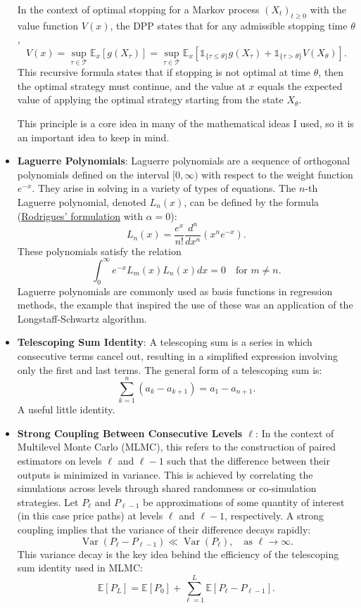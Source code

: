 \documentclass[titlepage]{article}
\begin{document}
\begin{itemize}
    In the context of optimal stopping for a Markov process $(X_t)_{t \geq 0}$ with the value function $V(x)$, the DPP states that for any admissible stopping time $\theta$,
    \[
    V(x) = \sup_{\tau \in \mathcal{T}} \mathbb{E}_x \left[ g(X_\tau) \right] = \sup_{\tau \in \mathcal{T}} \mathbb{E}_x \left[ \mathbb{1}_{\{\tau \leq \theta\}} g(X_\tau) + \mathbb{1}_{\{\tau > \theta\}} V(X_\theta) \right].
    \]
    This recursive formula states that if stopping is not optimal at time $\theta$, then the optimal strategy must continue, and the value at $x$ equals the expected value of applying the optimal strategy starting from the state $X_\theta$.
    \par This principle is a core idea in many of the mathematical ideas I used, so it is an important idea to keep in mind.
    

    \item \textbf{Laguerre Polynomials}: \label{sec:Laguerre}Laguerre polynomials are a sequence of orthogonal polynomials defined on the interval $[0, \infty)$ with respect to the weight function $e^{-x}$. They arise in solving in a variety of types of equations. The $n$-th Laguerre polynomial, denoted $L_n(x)$, can be defined by the formula (\href{https://en.wikipedia.org/wiki/Rodrigues%27_formula#Laguerre[9]}{Rodrigues' formulation} with $\alpha = 0$):
    \[
    L_n(x) = \frac{e^{x}}{n!} \frac{d^n}{dx^n} \left( x^n e^{-x} \right).
    \]
    These polynomials satisfy the relation
    \[
    \int_0^\infty e^{-x} L_m(x) L_n(x) dx = 0 \quad \text{for } m \neq n.
    \]
    Laguerre polynomials are commonly used as basis functions in regression methods, the example that inspired the use of these was an application of the Longstaff-Schwartz algorithm.

    \item \textbf{Telescoping Sum Identity}: \label{sec:telescoping}A telescoping sum is a series in which consecutive terms cancel out, resulting in a simplified expression involving only the first and last terms. The general form of a telescoping sum is:
    \[
    \sum_{k=1}^{n} (a_k - a_{k+1}) = a_1 - a_{n+1}.
    \]
    A useful little identity.

    \item \textbf{Strong Coupling Between Consecutive Levels \(\ell\)}: \label{sec:Strong Coupling}In the context of Multilevel Monte Carlo (MLMC), this refers to the construction of paired estimators on levels \(\ell\) and \(\ell - 1\) such that the difference between their outputs is minimized in variance. This is achieved by correlating the simulations across levels through shared randomness or co-simulation strategies. Let \( P_\ell \) and \( P_{\ell-1} \) be approximations of some quantity of interest (in this case price paths) at levels \(\ell\) and \(\ell-1\), respectively. A strong coupling implies that the variance of their difference decays rapidly:
    \[
    \operatorname{Var}(P_\ell - P_{\ell-1}) \ll \operatorname{Var}(P_\ell), \quad \text{as } \ell \to \infty.
    \]
    This variance decay is the key idea behind the efficiency of the telescoping sum identity used in MLMC:
    \[
    \mathbb{E}[P_L] = \mathbb{E}[P_0] + \sum_{\ell=1}^{L} \mathbb{E}[P_\ell - P_{\ell-1}].
    \]
    

\end{itemize}
\end{document}
